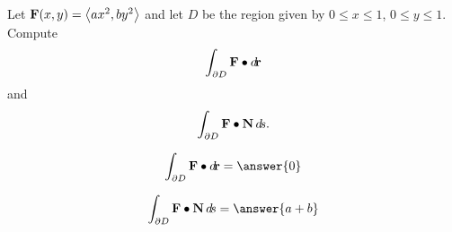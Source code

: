 \documentclass{ximera}
\author{David Guichard \and Neal Koblitz \and H. Jerome Keisler \and Albert Scheller \and Barry Balof \and Mike Wills \and Matthew Carr}
\begin{document}
\begin{exercise}




Let $\mathbf{F}(x,y)=\left\langle ax^2,by^2\right\rangle$ and let $D$ be the region given by $0\le x\le 1$, $0\le y\le 1$. Compute
\[
\int_{\partial D}\mathbf{F}\bullet\mathop{}\!d\!\mathbf{r}
\]
and
\[
\int_{\partial D}\mathbf{F}\bullet\mathbf{N}\mathop{}\!d\! s.
\] 
\begin{prompt}
\[
\int_{\partial D}\vec{F}\dotp\d\vec{r}=\answer{0}
\]
\end{prompt}

\begin{prompt}
\[
\int_{\partial D}\vec{F}\dotp\vec{N}\d s=\answer{a+b}
\]
\end{prompt}



\end{exercise}
\end{document}
